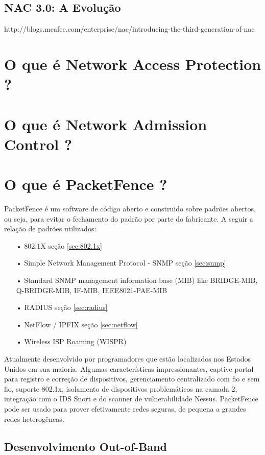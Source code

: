 \documentclass[12pt, brazil, ruledheader, pnumromarab,normaltoc]{abnt}
\begin{document}
\subsection{NAC 3.0: A Evolução}
http://blogs.mcafee.com/enterprise/nac/introducing-the-third-generation-of-nac

\section{O que é Network Access Protection ?}

\section{O que é Network Admission Control ?}

\section{O que é PacketFence ?}
PacketFence \cite{url-pf} é um software de código aberto e construido sobre padrões abertos, ou seja, para evitar o fechamento do padrão por parte do fabricante. A seguir a relação de padrões utilizados:
\begin{enumerate}
\item [•] 802.1X seção \ref{sec:802.1x}
\item [•] Simple Network Management Protocol - SNMP seção \ref{sec:snmp}
\item [•] Standard SNMP management information base (MIB) like BRIDGE-MIB, Q-BRIDGE-MIB, IF-MIB, IEEE8021-PAE-MIB
\item [•] RADIUS seção \ref{sec:radius}
\item [•] NetFlow / IPFIX seção \ref{sec:netflow}
\item [•] Wireless ISP Roaming (WISPR)
\end{enumerate}

Atualmente desenvolvido por programadores que estão localizados nos Estados Unidos em sua maioria. Algumas características impressionantes, captive portal para registro e correção de dispositivos, gerenciamento centralizado com fio e sem fio, suporte 802.1x, isolamento de dispositivos problemáticos na camada 2, integração com o IDS Snort e do scanner de vulnerabilidade Nessus. PacketFence pode ser usado para prover efetivamente redes seguras, de pequena a grandes redes heterogêneas.

\subsection{Desenvolvimento Out-of-Band}
\end{document}
